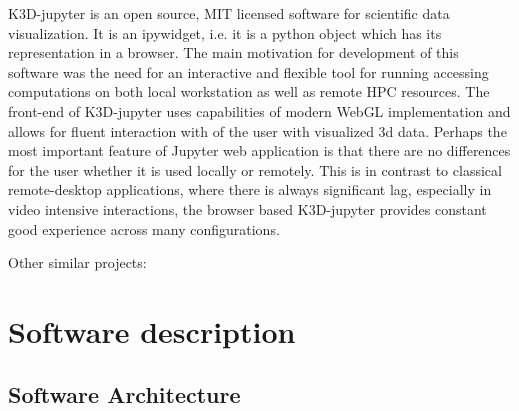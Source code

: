 \documentclass[preprint,12pt, a4paper]{elsarticle}
\begin{document}
K3D-jupyter is an open source, MIT licensed software for scientific
data visualization. It is an ipywidget, i.e. it is a python object
which has its representation in a browser. The main motivation for
development of this software was the need for an interactive and
flexible tool for running accessing computations on both local
workstation as well as remote HPC resources. The front-end of
K3D-jupyter uses capabilities of modern WebGL implementation and
allows for fluent interaction with of the user with visualized 3d
data. Perhaps the most important feature of Jupyter web application is
that there are no differences for the user whether it is used locally
or remotely. This is in contrast to classical remote-desktop
applications, where there is always significant lag, especially in
video intensive interactions, the browser based K3D-jupyter provides
constant good experience across many configurations.

Other similar projects:
\cite{10.1145/3093338.3104159}
\cite{10.1093/bioinformatics/btx789}




\section{Software description}
\label{}





\subsection{Software Architecture}
\label{}

\end{document}
